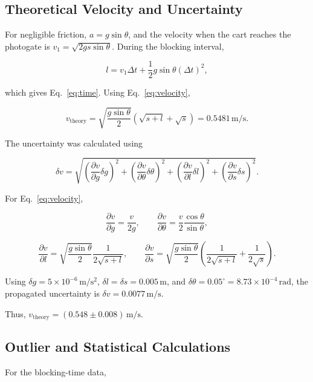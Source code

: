 \documentclass[12pt,a4paper]{article}
\begin{document}
{\small
\singlespacing

\subsection{Theoretical Velocity and Uncertainty}
\label{app:theory}

For negligible friction, \(a=g\sin\theta\), and the velocity when the cart reaches the photogate is \(v_1=\sqrt{2gs\sin\theta}\). During the blocking interval,

\[
l=v_1\Delta t+\frac{1}{2}g\sin\theta(\Delta t)^2,
\]

which gives Eq.~\ref{eq:time}. Using Eq.~\ref{eq:velocity},

\[
v_{\mathrm{theory}}
=
\sqrt{\frac{g\sin\theta}{2}}
\left(\sqrt{s+l}+\sqrt{s}\right)
=
0.5481\,\mathrm{m/s}.
\]

The uncertainty was calculated using

\[
\delta v=
\sqrt{
\left(\frac{\partial v}{\partial g}\delta g\right)^2+
\left(\frac{\partial v}{\partial\theta}\delta\theta\right)^2+
\left(\frac{\partial v}{\partial l}\delta l\right)^2+
\left(\frac{\partial v}{\partial s}\delta s\right)^2
}.
\]

For Eq.~\ref{eq:velocity},

\[
\frac{\partial v}{\partial g}=\frac{v}{2g}, \qquad
\frac{\partial v}{\partial\theta}
=\frac{v}{2}\frac{\cos\theta}{\sin\theta},
\]

\[
\frac{\partial v}{\partial l}
=
\sqrt{\frac{g\sin\theta}{2}}
\frac{1}{2\sqrt{s+l}},
\qquad
\frac{\partial v}{\partial s}
=
\sqrt{\frac{g\sin\theta}{2}}
\left(
\frac{1}{2\sqrt{s+l}}+
\frac{1}{2\sqrt{s}}
\right).
\]

Using
\(\delta g=5\times10^{-6}\,\mathrm{m/s^2}\),
\(\delta l=\delta s=0.005\,\mathrm{m}\), and
\(\delta\theta=0.05^\circ=8.73\times10^{-4}\,\mathrm{rad}\),
the propagated uncertainty is
\(\delta v=0.0077\,\mathrm{m/s}\).

Thus,
\(v_{\mathrm{theory}}=(0.548\pm0.008)\,\mathrm{m/s}\).

\subsection{Outlier and Statistical Calculations}
\label{app:statistics}

For the blocking-time data,

}
\end{document}
